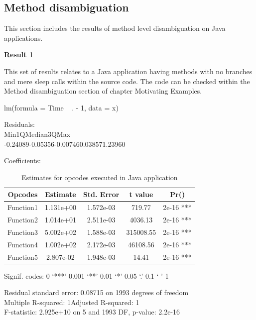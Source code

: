 \documentclass[11pt]{article}
\begin{document}
\subsection{Method disambiguation}
This section includes the results of method level disambiguation on Java applications. 

\textbf{Result 1}

This set of results relates to a Java application having methods with no branches and mere sleep calls within the source code. The code can be checked within the Method disambiguation section of chapter Motivating Examples. 

lm(formula = Time ~ . - 1, data = x)

Residuals:\\
Min\hspace{4em}1Q\hspace{4em}Median\hspace{3em}3Q\hspace{4em}Max \\
-0.24089\hspace{2em}-0.05356\hspace{2em}-0.00746\hspace{2em}0.03857\hspace{2em}1.23960 

Coefficients:\\
\begin{table}[h!]
\begin{center}
 \begin{tabular}{ |c|c|c|c|c| }
 \hline
 Opcodes&Estimate&Std. Error&t value&Pr()    \\
 \hline
Function1&1.131e+00&1.572e-03&719.77&2e-16 ***\\
Function2&1.014e+01&2.511e-03&4036.13&2e-16 ***\\
Function3&5.002e+02&1.588e-03&315008.55&2e-16 ***\\
Function4&1.002e+02&2.172e-03&46108.56&2e-16 ***\\
Function5&2.807e-02&1.948e-03&14.41&2e-16 ***\\
 \hline
 \end{tabular}
\end{center}
\caption{Estimates for opcodes executed in Java application}
\label{Linear Regression results:3}
\end{table}

Signif. codes:  0 ‘***’ 0.001 ‘**’ 0.01 ‘*’ 0.05 ‘.’ 0.1 ‘ ’ 1

Residual standard error: 0.08715 on 1993 degrees of freedom\\
Multiple R-squared:      1\hspace{2em}Adjusted R-squared:      1\\ 
F-statistic: 2.925e+10 on 5 and 1993 DF,  p-value: 2.2e-16
\end{document}
